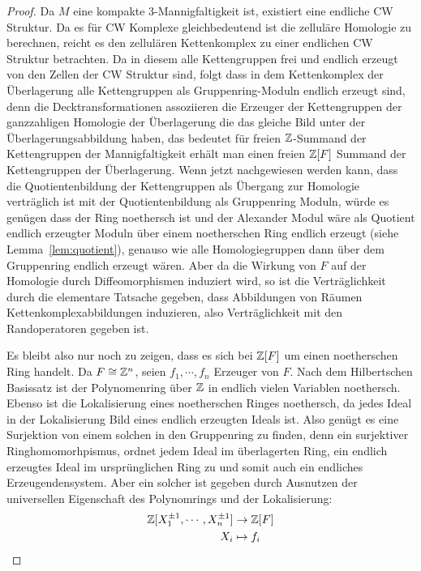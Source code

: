 	\begin{proof}
	Da $M$ eine kompakte 3-Mannigfaltigkeit ist, existiert eine endliche CW Struktur. Da es für CW Komplexe gleichbedeutend ist die zelluläre Homologie zu berechnen, reicht es den zellulären Kettenkomplex zu einer endlichen CW Struktur betrachten. Da in diesem alle Kettengruppen frei und endlich erzeugt von den Zellen der CW Struktur sind, folgt dass in dem Kettenkomplex der Überlagerung alle Kettengruppen als Gruppenring-Moduln endlich erzeugt sind, denn die Decktransformationen assoziieren die Erzeuger der Kettengruppen der ganzzahligen Homologie der Überlagerung die das gleiche Bild unter der Überlagerungsabbildung haben, das bedeutet für freien $\mathbb{Z}$-Summand der Kettengruppen der Mannigfaltigkeit erhält man einen freien $\mathbb{Z}[F]$ Summand der Kettengruppen der Überlagerung. Wenn jetzt nachgewiesen werden kann, dass die Quotientenbildung der Kettengruppen als Übergang zur Homologie verträglich ist mit der Quotientenbildung als Gruppenring Moduln, würde es genügen dass der Ring noethersch ist und der Alexander Modul wäre als Quotient endlich erzeugter Moduln über einem noetherschen Ring endlich erzeugt (siehe Lemma~\ref{lem:quotient}), genauso wie alle Homologiegruppen dann über dem Gruppenring endlich erzeugt wären. Aber da die Wirkung von $F$ auf der Homologie durch Diffeomorphismen induziert wird, so ist die Verträglichkeit durch die elementare Tatsache gegeben, dass Abbildungen von Räumen Kettenkomplexabbildungen induzieren, also Verträglichkeit mit den Randoperatoren gegeben ist.

	Es bleibt also nur noch zu zeigen, dass es sich bei $\mathbb{Z}[F]$ um einen noetherschen Ring handelt. Da $F\cong \mathbb{Z}^n$, seien $f_1,\cdots,f_n$ Erzeuger von $F$. Nach dem Hilbertschen Basissatz ist der Polynomenring über $\mathbb{Z}$ in endlich vielen Variablen noethersch. Ebenso ist die Lokalisierung eines noetherschen Ringes noethersch, da jedes Ideal in der Lokalisierung Bild eines endlich erzeugten Ideals ist. Also genügt es eine Surjektion von einem solchen in den Gruppenring zu finden, denn ein surjektiver Ringhomomorhpismus, ordnet jedem Ideal im überlagerten Ring, ein endlich erzeugtes Ideal im ursprünglichen Ring zu und somit auch ein endliches Erzeugendensystem. Aber ein solcher ist gegeben durch Ausnutzen der universellen Eigenschaft des Polynomrings und der Lokalisierung:
	\begin{align*}
			\mathbb{Z}[X_1^{\pm 1},\cdots,X_{n}^{\pm 1}] & \to  \mathbb{Z}[F]\\
			X_i &\mapsto  f_i
	\end{align*}
\end{proof}

